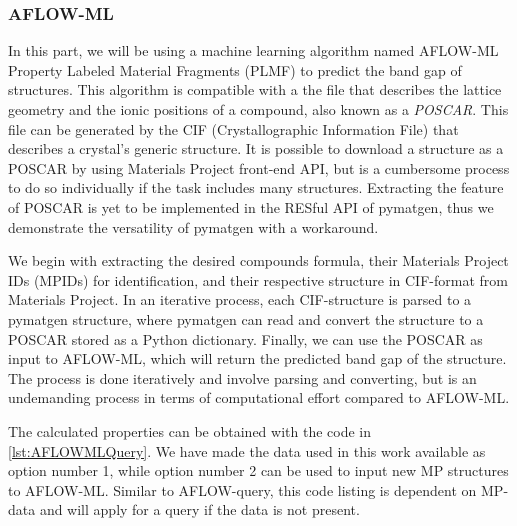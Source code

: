 \subsubsection{AFLOW-ML}

In this part, we will be using a machine learning algorithm named AFLOW-ML Property Labeled Material Fragments (PLMF) \cite{Isayev2017} to predict the band gap of structures. This algorithm is compatible with a the file that describes the lattice geometry and the ionic positions of a compound, also known as a \textit{POSCAR}. This file can be generated by the CIF (Crystallographic Information File) that describes a crystal's generic structure. It is possible to download a structure as a POSCAR by using Materials Project front-end API, but is a cumbersome process to do so individually if the task includes many structures. Extracting the feature of POSCAR is yet to be implemented in the RESful API of pymatgen, thus we demonstrate the versatility of pymatgen with a workaround.

We begin with extracting the desired compounds formula, their Materials Project IDs (MPIDs) for identification, and their respective structure in CIF-format from Materials Project. In an iterative process, each CIF-structure is parsed to a pymatgen structure, where pymatgen can read and convert the structure to a POSCAR stored as a Python dictionary. Finally, we can use the POSCAR as input to AFLOW-ML, which will return the predicted band gap of the structure. The process is done iteratively and involve parsing and converting, but is an undemanding process in terms of computational effort compared to AFLOW-ML.



The calculated properties can be obtained with the code in \autoref{lst:AFLOWMLQuery}. We have made the data used in this work available as option number 1, while option number 2 can be used to input new MP structures to AFLOW-ML. Similar to AFLOW-query, this code listing is dependent on MP-data and will apply for a query if the data is not present.

